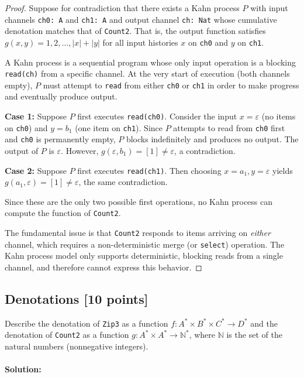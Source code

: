 \documentclass[11pt]{article}
\newcommand{\mnt}[1]{{\small\texttt{#1}}}
\theoremstyle{definition}
\newcommand{\N}{\mathbb{N}}
\newcommand{\kstar}{^{\textstyle *}}
\begin{document}
\begin{proof}
	Suppose for contradiction that there exists a Kahn process $P$ with input channels \mnt{ch0: A} and \mnt{ch1: A} and output channel \mnt{ch: Nat} whose cumulative denotation matches that of \mnt{Count2}. That is, the output function satisfies $g(x, y) = 1, 2, \ldots, |x| + |y|$ for all input histories $x$ on \mnt{ch0} and $y$ on \mnt{ch1}.

	A Kahn process is a sequential program whose only input operation is a blocking \mnt{read(ch)} from a specific channel. At the very start of execution (both channels empty), $P$ must attempt to \mnt{read} from either \mnt{ch0} or \mnt{ch1} in order to make progress and eventually produce output.

	\textbf{Case 1:} Suppose $P$ first executes \mnt{read(ch0)}. Consider the input $x = \varepsilon$ (no items on \mnt{ch0}) and $y = b_1$ (one item on \mnt{ch1}). Since $P$ attempts to read from \mnt{ch0} first and \mnt{ch0} is permanently empty, $P$ blocks indefinitely and produces no output. The output of $P$ is $\varepsilon$. However, $g(\varepsilon, b_1) = [1] \neq \varepsilon$, a contradiction.

	\textbf{Case 2:} Suppose $P$ first executes \mnt{read(ch1)}. Then choosing $x = a_1, y = \varepsilon$ yields $g(a_1, \varepsilon) = [1] \neq \varepsilon$, the same contradiction.

	Since these are the only two possible first operations, no Kahn process can compute the function of \mnt{Count2}.

	The fundamental issue is that \mnt{Count2} responds to items arriving on \emph{either} channel, which requires a non-deterministic merge (or \mnt{select}) operation. The Kahn process model only supports deterministic, blocking reads from a single channel, and therefore cannot express this behavior.
\end{proof}

\clearpage %
\subsection{Denotations [10 points]}

Describe the denotation of \mnt{Zip3} as a function $f: A\kstar \times B\kstar \times C\kstar \to D\kstar$ and the denotation of \mnt{Count2} as a function $g: A\kstar \times A\kstar \to \N\kstar$, where $\N$ is the set of the natural numbers (nonnegative integers).

\paragraph{Solution:}
\end{document}
